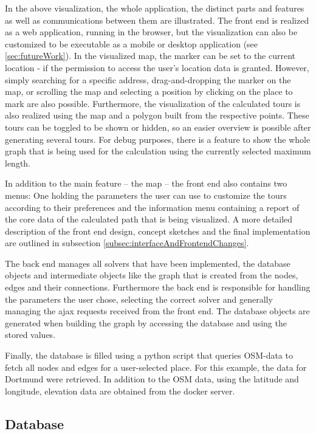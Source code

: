 In the above visualization, the whole application, the distinct parts and features as well as communications between them are illustrated. 
The front end is realized as a web application, running in the browser, but the visualization can also be customized to be executable as a mobile or desktop application (see \ref{sec:futureWork}). 
In the visualized map, the marker can be set to the current location - if the permission to access the user's location data is granted.
However, simply searching for a specific address, drag-and-dropping the marker on the map, or scrolling the map and selecting a position by clicking on the place to mark are also possible. 
Furthermore, the visualization of the calculated tours is also realized using the map and a polygon built from the respective points.
These tours can be toggled to be shown or hidden, so an easier overview is possible after generating several tours.
For debug purposes, there is a feature to show the whole graph that is being used for the calculation using the currently selected maximum length.

In addition to the main feature -- the map -- the front end also contains two menus:
One holding the parameters the user can use to customize the tours according to their preferences and the information menu containing a report of the core data of the calculated path that is being visualized. 
A more detailed description of the front end design, concept sketches and the final implementation are outlined in subsection \ref{subsec:interfaceAndFrontendChanges}.

The back end manages all solvers that have been implemented, the database objects and intermediate objects like the graph that is created from the nodes, edges and their connections. 
Furthermore the back end is responsible for handling the parameters the user chose, selecting the correct solver and generally managing the ajax requests received from the front end. 
The database objects are generated when building the graph by accessing the database and using the stored values.

Finally, the database is filled using a python script that queries OSM-data to fetch all nodes and edges for a user-selected place.
For this example, the data for Dortmund were retrieved.
In addition to the OSM data, using the latitude and longitude, elevation data are obtained from the docker server. 

\subsection{Database}
\label{subsection:database}

